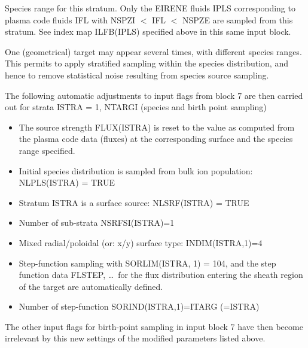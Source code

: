 \begin{description}
        Species range for this stratum.
        Only the EIRENE fluids IPLS corresponding to plasma code fluids IFL with  NSPZI
        $<$ IFL $<$ NSPZE are sampled from this stratum.
        See index map ILFB(IPLS) specified above in this same input block.

        One (geometrical) target may appear several times, with different species
        ranges.
        This permits to apply stratified sampling within the species distribution, and
        hence to remove statistical noise resulting from species source sampling.
\end{description}

The following automatic adjustments to input flags from block 7 are then
carried out for strata ISTRA = 1, NTARGI (species and birth point sampling)
\begin{itemize}
  \item The source strength FLUX(ISTRA) is reset to the value as
        computed from the plasma code data (fluxes) at the corresponding surface and
        the species range specified.
  \item Initial species distribution is sampled from bulk ion population:
        NLPLS(ISTRA) = TRUE
  \item Stratum ISTRA is a surface source:
        NLSRF(ISTRA) = TRUE
  \item Number of sub-strata NSRFSI(ISTRA)=1
  \item Mixed
        radial/poloidal (or: x/y) surface type: INDIM(ISTRA,1)=4
  \item Step-function
        sampling with SORLIM(ISTRA, 1) = 104, and the step function data FLSTEP, \dots\
        for the flux distribution entering the sheath region of the target are
        automatically defined.
  \item Number of step-function  SORIND(ISTRA,1)=ITARG (=ISTRA)
\end{itemize}
The
other input flags for birth-point sampling in input block 7 have then become
irrelevant by this new settings of the modified parameters listed above.

